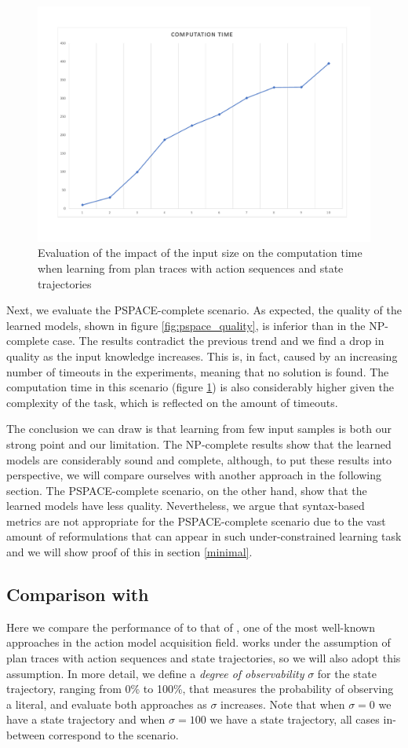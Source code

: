 \begin{figure}[hbt!]
	\centering
	\includegraphics[width=0.8\linewidth]{figures/input_size_0_0_time.pdf}
	\caption{Evaluation of the impact of the input size on the computation time when learning from plan traces with \NO action sequences and \NO state trajectories}
	\label{fig:pspace_time}
\end{figure}

Next, we evaluate the PSPACE-complete scenario. As expected, the quality of the learned models, shown in figure \ref{fig:pspace_quality}, is inferior than in the NP-complete case. The results contradict the previous trend and we find a drop in quality as the input knowledge increases. This is, in fact, caused by an increasing number of timeouts in the experiments, meaning that no solution is found. The computation time in this scenario (figure \ref{fig:pspace_time}) is also considerably higher given the complexity of the task, which is reflected on the amount of timeouts.

The conclusion we can draw is that learning from few input samples is both our strong point and our limitation. The NP-complete results show that the learned models are considerably sound and complete, although, to put these results into perspective, we will compare ourselves with another approach in the following section. The PSPACE-complete scenario, on the other hand, show that the learned models have less quality. Nevertheless, we argue that syntax-based metrics are not appropriate for the PSPACE-complete scenario due to the vast amount of reformulations that can appear in such under-constrained learning task and we will show proof of this in section \ref{minimal}.


\subsection{Comparison with \ARMS}
Here we compare the performance of \FAMA to that of \ARMS, one of the most well-known approaches in the action model acquisition field. \ARMS works under the assumption of plan traces with \FO action sequences and \NO state trajectories, so we will also adopt this assumption. In more detail, we define a \emph{degree of observability} $\sigma$ for the state trajectory, ranging from 0\% to 100\%, that measures the probability of observing a literal, and evaluate both approaches as $\sigma$ increases. Note that when $\sigma = 0$ we have a \NO state trajectory and when $\sigma=100$ we have a \FO state trajectory, all cases in-between correspond to the \PO scenario.

